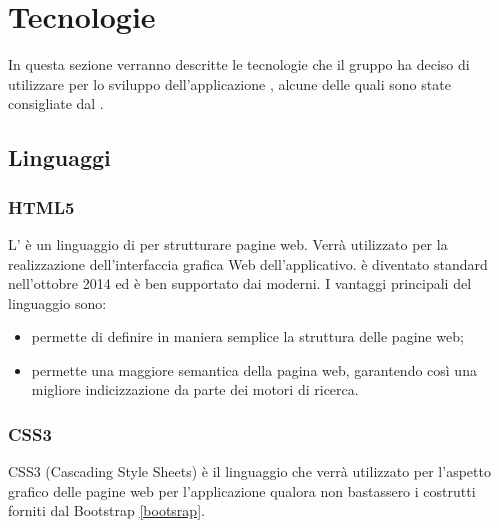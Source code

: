\documentclass[12pt,a4paper]{article}
\begin{document}
\section{Tecnologie}\label{tecnologie}
In questa sezione verranno descritte le tecnologie che il gruppo ha deciso di utilizzare per lo sviluppo dell'applicazione \prjL{}, alcune delle quali sono state consigliate dal .


\subsection{Linguaggi}
\subsubsection{HTML5}\label{html}
L’ è un linguaggio di  per strutturare pagine web. Verrà utilizzato per la realizzazione dell’interfaccia grafica Web dell’applicativo.  è diventato standard  nell’ottobre 2014 ed è ben supportato dai  moderni.
I vantaggi principali del linguaggio sono:
\begin{itemize}
	\item permette di definire in maniera semplice la struttura delle pagine web;
	\item permette una maggiore semantica della pagina web, garantendo così una migliore indicizzazione da parte dei motori di ricerca.
\end{itemize}

\subsubsection{CSS3}\label{css}
CSS3 (Cascading Style Sheets) è il linguaggio che verrà utilizzato per l’aspetto grafico delle pagine web per l'applicazione qualora non bastassero i costrutti forniti dal
 Bootstrap \ref{bootsrap}.
\end{document}
